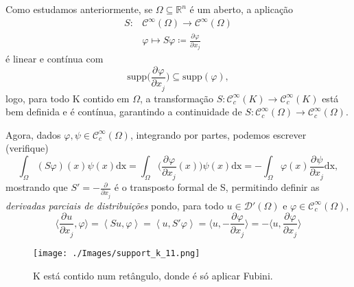 \documentclass[../distribution_theory_notes.tex]{subfiles}
\begin{document}
\begin{example}
	Como estudamos anteriormente, se \(\Omega \subseteq \mathbb{R}^{n}\) é um aberto, a aplicação
	\begin{align*}
		S: & \mathcal{C}^{\infty}(\Omega )\rightarrow \mathcal{C}^{\infty}(\Omega )               \\
		   & \varphi \longmapsto S\varphi \coloneqq \frac{\partial^{}\varphi }{\partial ^{}x_{j}}
	\end{align*}
	é linear e contínua com
	\[
		\mathrm{supp} \biggl(\frac{\partial^{}\varphi }{\partial x_{j}^{}}\biggr) \subseteq \mathrm{supp}(\varphi ),
	\]
	logo, para todo K contido em \(\Omega \), a transformação \(S:\mathcal{C}_{c}^{\infty}(K)\rightarrow \mathcal{C}_{c}^{\infty}(K)\) está bem definida e é contínua, garantindo a continuidade de \(S:\mathcal{C}_{c}^{\infty}(\Omega )\rightarrow \mathcal{C}_{c}^{\infty}(\Omega )\).

	Agora, dados \(\varphi , \psi \in \mathcal{C}_{c}^{\infty}(\Omega )\), integrando por partes, podemos escrever (verifique)
	\[
		\int_{\Omega }^{}(S\varphi )(x)\psi (x) \mathrm{dx} = \int_{\Omega }^{}\biggr(\frac{\partial^{}\varphi }{\partial x_{j}^{}}(x)\biggl)\psi (x) \mathrm{dx} = - \int_{\Omega }^{}\varphi (x)\frac{\partial^{}\psi }{\partial x_{j}^{}} \mathrm{dx},
	\]
	mostrando que \(S'=-\frac{\partial^{}}{\partial x_{j}^{}}\) é o transposto formal de S, permitindo definir as \textit{derivadas parciais de distribuições} pondo, para todo \(u\in \mathcal{D}'(\Omega )\) e \(\varphi \in \mathcal{C}_{c}^{\infty}(\Omega )\),
	\[
		\biggr\langle \frac{\partial^{}u}{\partial x_{j}^{}}, \varphi  \biggl\rangle = \left< Su, \varphi  \right> = \left< u, S'\varphi  \right> = \biggr\langle u, - \frac{\partial^{}\varphi }{\partial x_{j}^{}}\biggl\rangle = -\biggr\langle u, \frac{\partial^{}\varphi }{\partial x_{j}^{}} \biggl\rangle
	\]
	\begin{figure}[H]
		\begin{center}
			\texttt{[image: ./Images/support\_k\_11.png]}
		\end{center}
		\caption{K está contido num retângulo, donde é só aplicar Fubini.}
	\end{figure}


\end{example}
\end{document}
